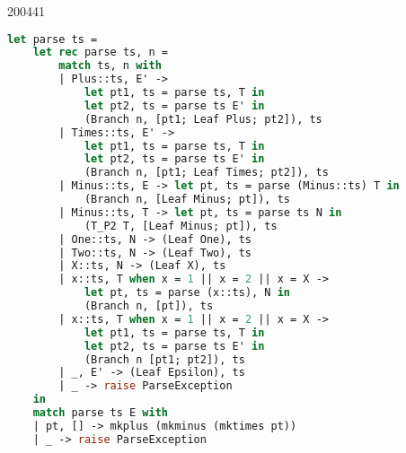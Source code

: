 \documentclass[10pt,\jkfside,a4paper]{article}
\begin{document}
\begin{examquestion}{2004}{4}{1}
\begin{enumerate}
\begin{lstlisting}[language=Caml]
let parse ts =
	let rec parse ts, n =
		match ts, n with
		| Plus::ts, E' ->
			let pt1, ts = parse ts, T in
			let pt2, ts = parse ts E' in
			(Branch n, [pt1; Leaf Plus; pt2]), ts
		| Times::ts, E' ->
			let pt1, ts = parse ts, T in
			let pt2, ts = parse ts E' in
			(Branch n, [pt1; Leaf Times; pt2]), ts
		| Minus::ts, E -> let pt, ts = parse (Minus::ts) T in
			(Branch n, [Leaf Minus; pt]), ts
		| Minus::ts, T -> let pt, ts = parse ts N in
			(T_P2 T, [Leaf Minus; pt]), ts
		| One::ts, N -> (Leaf One), ts
		| Two::ts, N -> (Leaf Two), ts
		| X::ts, N -> (Leaf X), ts
		| x::ts, T when x = 1 || x = 2 || x = X ->
			let pt, ts = parse (x::ts), N in
			(Branch n, [pt]), ts
		| x::ts, T when x = 1 || x = 2 || x = X ->
			let pt1, ts = parse ts, T in
			let pt2, ts = parse ts E' in
			(Branch n [pt1; pt2]), ts
		| _, E' -> (Leaf Epsilon), ts
		| _ -> raise ParseException
	in
	match parse ts E with
	| pt, [] -> mkplus (mkminus (mktimes pt))
	| _ -> raise ParseException
\end{lstlisting}

\iffalse

\begin{lstlisting}[language=Caml, mathescape=||]

(* I assume mkplus rotates the tree such that plus is left-associative *)
(* I assume mkneg pulls all -'s up until they are at the correct precedence *)

type n = E | E' | A | T | T' | N

type t = + | - | 1 | 2 | X

type parseTree = E_P1 of parseTree * parseTree
		| E'_P1 of t * parseTree * parseTree
		| E'_P2 of Epsilon
		| ...

let parse ts =
	let rec parse ts, n =
		match ts with
		| [] ->
			if n != E' and n != T' then
				raise ParseException
		| Plus::ts ->
			match n with
			| E' ->
				let pt1, ts = parse ts T in
				let pt2, ts = parse ts E' in
				(E'_P1 Plus pt1 pt2), ts
			| _ ->
				raise ParseException
		| Minus::ts ->
			match n with
			| E ->
				let pt, ts = parse ts T in
				(E_P1 Minus pt), ts
			| T ->
				let pt, ts = parse ts N in
				(T_P2 Minus pt), ts
			| _ ->
				raise ParseException
		| x::ts when x = 1 || x = 2 || x = X ->
			match n with
			| N -> N_P1, ts
			| T -> (T_P1 N_P1), ts
			| E ->
				let pt1, ts = parse ts, T in
				let pt2, ts = parse ts, E' in
				(E_P1 x pt1 pt2), ts
			| _ -> raise ParseException
	in
	match parse ts E in with
	| pt, [] -> mkplus (mkminus (mktimes pt))
	| _ -> raise ParseException
;;


\end{lstlisting}

\fi

\end{enumerate}

\end{examquestion}
\end{document}
